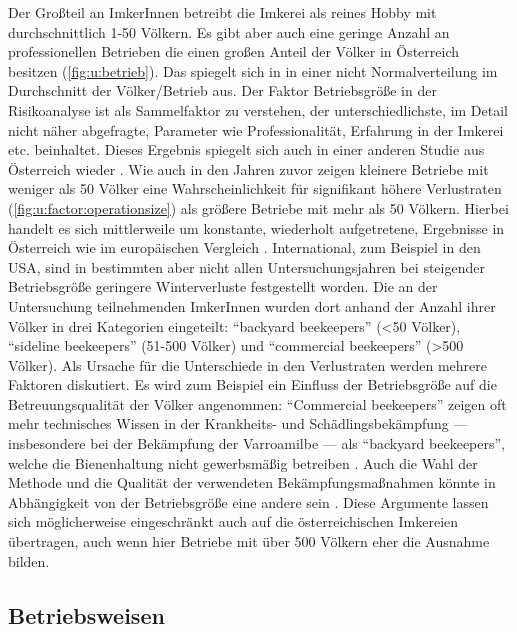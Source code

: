 Der Großteil an ImkerInnen betreibt die Imkerei als reines Hobby mit durchschnittlich 1-50 Völkern. Es gibt aber auch eine geringe Anzahl an professionellen Betrieben die einen großen Anteil der Völker in Österreich besitzen (\cref{fig:u:betrieb}). Das spiegelt sich in in einer nicht Normalverteilung im Durchschnitt der Völker/Betrieb aus. Der Faktor Betriebsgröße in der Risikoanalyse ist als Sammelfaktor zu verstehen, der unterschiedlichste, im Detail nicht näher abgefragte, Parameter wie Professionalität, Erfahrung in der Imkerei etc. beinhaltet. Dieses Ergebnis spiegelt sich auch in einer anderen Studie aus Österreich wieder \citep{morawetz2019}.
\newline
Wie auch in den Jahren zuvor zeigen kleinere Betriebe mit weniger als 50 Völker eine Wahrscheinlichkeit für signifikant höhere Verlustraten (\cref{fig:u:factor:operationsize}) als größere Betriebe mit mehr als 50 Völkern. Hierbei handelt es sich mittlerweile um konstante, wiederholt aufgetretene,  Ergebnisse in Österreich wie im europäischen Vergleich \citep{brodschneider2016,brodschneider2018,crailsheim2018,oberreiter2020,vanderzee2014}. International, zum Beispiel in den USA, sind in bestimmten aber nicht allen Untersuchungsjahren bei steigender Betriebsgröße geringere Winterverluste festgestellt worden. Die an der Untersuchung teilnehmenden ImkerInnen wurden dort anhand der Anzahl ihrer Völker in drei Kategorien eingeteilt: \enquote{backyard beekeepers} (<50 Völker), \enquote{sideline beekeepers} (51-500 Völker) und \enquote{commercial beekeepers} (>500 Völker). Als Ursache für die Unterschiede in den Verlustraten werden mehrere Faktoren diskutiert. Es wird zum Beispiel ein Einfluss der Betriebsgröße auf die Betreuungsqualität der Völker angenommen: \enquote{Commercial beekeepers} zeigen oft mehr technisches Wissen in der Krankheits- und Schädlingsbekämpfung --- insbesondere bei der Bekämpfung der Varroamilbe --- als \enquote{backyard beekeepers}, welche die Bienenhaltung nicht gewerbsmäßig betreiben \citep{lee2015}. Auch die Wahl der Methode und die Qualität der verwendeten Bekämpfungsmaßnahmen könnte in Abhängigkeit von der Betriebsgröße eine andere sein \citep{underwood2019, thoms2019a}. Diese Argumente lassen sich möglicherweise eingeschränkt auch auf die österreichischen Imkereien übertragen, auch wenn hier Betriebe mit über 500 Völkern eher die Ausnahme bilden.

\subsection{Betriebsweisen}

